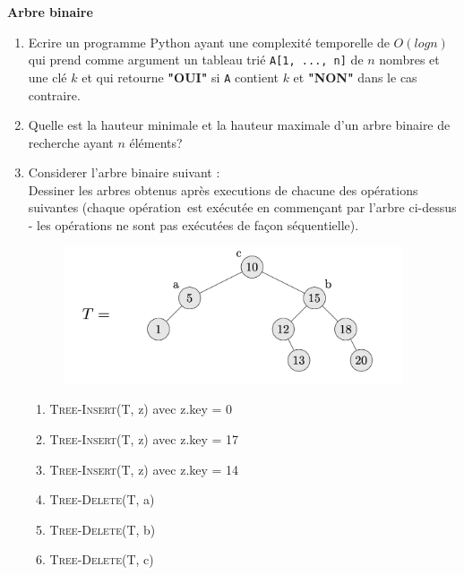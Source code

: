 \begin{Exercice}[20 minutes]\textbf{Arbre binaire}\\
	\begin{enumerate}
		\item Ecrire un programme Python ayant une complexité temporelle de $O(log n)$ qui prend comme argument un tableau trié \lstinline{A[1, ..., n]} de $n$ nombres et une clé $k$ et qui retourne \textbf{"OUI"} si \lstinline{A} contient $k$ et \textbf{"NON"} dans le cas contraire.
		\item Quelle est la hauteur minimale et la hauteur maximale d'un arbre binaire de recherche ayant $n$ éléments?
		\item Considerer l'arbre binaire suivant : \\
		
		Dessiner les arbres obtenus après executions de chacune des opérations suivantes (chaque opération~est exécutée en commençant par l'arbre ci-dessus - les opérations ne sont pas exécutées de façon séquentielle).
		
		\begin{figure}[h!]
        			\centering
       	 		\includegraphics[width=10cm]{resources/exoArbreBinEnonce.png}
	    	\end{figure}
		\begin{enumerate}
			\item \textsc{Tree-Insert}(T, z) avec z.key = 0
			\item \textsc{Tree-Insert}(T, z) avec z.key = 17
			\item \textsc{Tree-Insert}(T, z) avec z.key = 14
			\item \textsc{Tree-Delete}(T, a)
			\item \textsc{Tree-Delete}(T, b)
			\item \textsc{Tree-Delete}(T, c)
		\end{enumerate}



\end{enumerate}
\end{Exercice}
